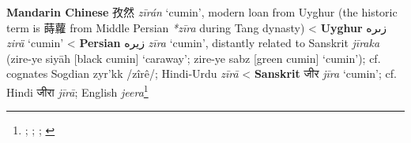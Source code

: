 \begin{etymology}\label{ety:ziran}
\textbf{Mandarin Chinese} {孜然} \textit{zī​rán} `cumin', modern loan from Uyghur (the historic term is 蒔蘿 from Middle Persian \textit{*zīra} during Tang dynasty)
< \textbf{Uyghur} {زىرە} \textit{zirä} `cumin'
< \textbf{Persian} {زیره} \textit{zīra} `cumin', distantly related to Sanskrit \textit{jīraka} (zire-ye siyāh [black cumin] `caraway'; zire-ye sabz [green cumin] `cumin'); cf. cognates Sogdian zyr'kk /zîrê/; Hindi-Urdu \textit{zīrā}
< \textbf{Sanskrit} {जीर} \textit{jīra} `cumin'; cf. Hindi जीरा \textit{jīrā}; English \textit{jeera}\footnote{\textcites[383]{laufer_sino-iranica_1919}[45]{sulaiman_uyghur_2020}[]{liu_hanyu_1985}; \textcite[561]{schwarz_uyghur-english_1992}; \textcite[634]{steingass_comprehensive_1892}; \textcites[375]{mcgregor_oxford_1993}}
\end{etymology}